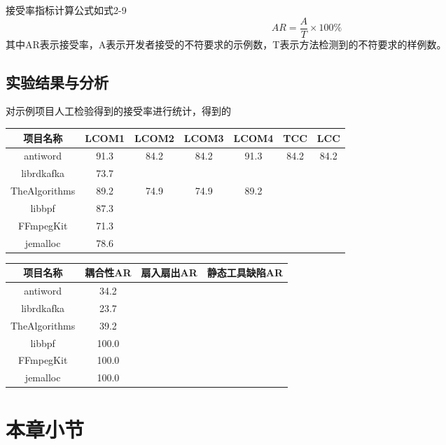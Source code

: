 接受率指标计算公式如式2-9
\begin{equation}
{AR} = \frac{A}{T} \times 100\%
\end{equation}
其中AR表示接受率，A表示开发者接受的不符要求的示例数，T表示方法检测到的不符要求的样例数。




\subsection{实验结果与分析}

对示例项目人工检验得到的接受率进行统计，得到的

\begin{table}[htbp]
\vspace{0.5em}\centering\wuhao
\begin{tabular}{ccccccc}
\toprule
项目名称 & LCOM1 & LCOM2 & LCOM3 & LCOM4 & TCC & LCC \\
\midrule
antiword & 91.3 & 84.2 & 84.2 & 91.3 & 84.2 & 84.2 \\
librdkafka & 73.7 &  &  &  &  &  \\
TheAlgorithms & 89.2 & 74.9 & 74.9 & 89.2 &  &  \\
libbpf & 87.3 &  & &  &  &   \\
FFmpegKit & 71.3 &  &  &  &  &  \\
jemalloc & 78.6 &  &  &  &  &  \\
\bottomrule
\end{tabular}
\end{table}

\begin{table}[htbp]
\vspace{0.5em}\centering\wuhao
\begin{tabular}{cccc}
\toprule
项目名称 & 耦合性AR & 扇入扇出AR & 静态工具缺陷AR \\
\midrule
antiword & 34.2 & &  \\
librdkafka & 23.7 &  &  \\
TheAlgorithms & 39.2 &  &  \\
libbpf & 100.0 &  &  \\
FFmpegKit & 100.0 &  &  \\
jemalloc & 100.0 &  &  \\
\bottomrule
\end{tabular}
\end{table}

\section{本章小节}

